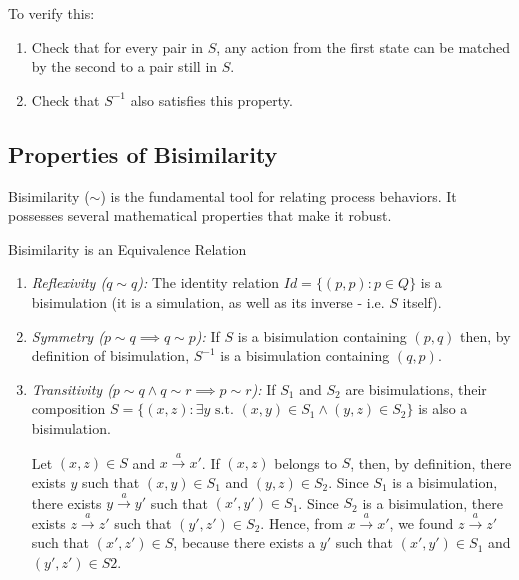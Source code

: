 To verify this:
\begin{enumerate}
    \item Check that for every pair in $S$, any action from the first state can be matched by the second to a pair still in $S$. 
    \item Check that $S^{-1}$ also satisfies this property.
\end{enumerate}

\subsection{Properties of Bisimilarity}
Bisimilarity ($\sim$) is the fundamental tool for relating process behaviors. It possesses several mathematical properties that make it robust.

\begin{Thm}{Bisimilarity is an Equivalence Relation}{}
\begin{enumerate}
    \item \textit{Reflexivity ($q\sim q$):} The identity relation $Id=\{(p,p):p\in Q\}$ is a bisimulation (it is a simulation, as well as its inverse - i.e. $S$ itself).
    \item \textit{Symmetry ($p\sim q\implies q\sim p$):} If $S$ is a bisimulation containing $(p,q)$ then, by definition of bisimulation, $S^{-1}$ is a bisimulation containing $(q,p)$.
    \item \textit{Transitivity ($p\sim q\land q\sim r\implies p\sim r$):} If $S_1$ and $S_2$ are bisimulations, their composition $S = \{(x, z) : \exists y \text{ s.t. } (x, y) \in S_1 \land (y, z) \in S_2\}$ is also a bisimulation.

    Let $(x, z) \in S$ and $x\xrightarrow{a}x'$. If $(x, z)$ belongs to $S$, then, by definition, there exists $y$ such that $(x,y) \in S_1$ and $(y,z) \in S_2$. Since $S_1$ is a bisimulation, there exists $y\xrightarrow{a}y'$ such that $(x', y') \in S_1$. Since $S_2$ is a bisimulation, there exists $z\xrightarrow{a}z'$ such that $(y', z') \in S_2$. Hence, from $x\xrightarrow{a}x'$, we found $z\xrightarrow{a}z'$ such that $(x', z') \in S$, because there exists a $y'$ such that $(x', y') \in S_1$ and $(y', z') \in S2$.
\end{enumerate}
\end{Thm}
    
